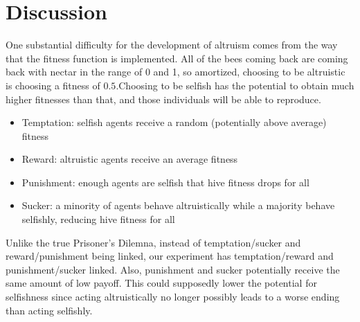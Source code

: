 \documentclass[11pt]{article}
\begin{document}


	\section{Discussion} %
	\label{sec:discussion}
		One substantial difficulty for the development of altruism comes from the way that the fitness function is implemented. All of the bees coming back are coming back with nectar in the range of 0 and 1, so amortized, choosing to be altruistic is choosing a fitness of $0.5$.Choosing to be selfish has the potential to obtain much higher
		fitnesses than that, and those individuals will be able to reproduce.

		\begin{itemize}
		\item Temptation: selfish agents receive a random (potentially above average) fitness
		\item Reward: altruistic agents receive an average fitness
		\item Punishment: enough agents are selfish that hive fitness drops for all
		\item Sucker: a minority of agents behave altruistically while a majority behave selfishly, reducing hive fitness for all
		\end{itemize}
		Unlike the true Prisoner's Dilemna, instead of temptation/sucker and reward/punishment being linked, our experiment has temptation/reward and punishment/sucker linked. Also, punishment and sucker potentially receive the same amount of low payoff. This could supposedly lower the potential for selfishness since acting altruistically no longer possibly leads to a worse ending than acting selfishly.



	
\end{document}
